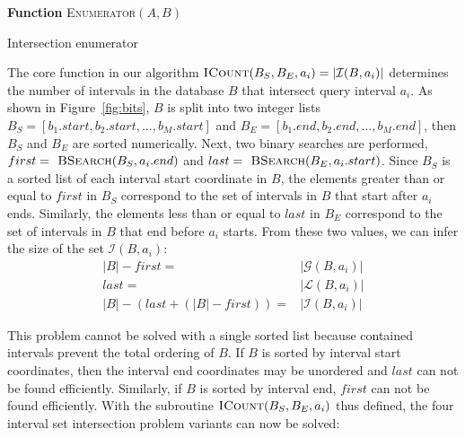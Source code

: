 \documentclass{bioinfo}
\begin{document}
	\begin{algorithm}[h]
		\DontPrintSemicolon
		\footnotesize
		\BlankLine
		\textbf{Function} \textsc{Enumerator}$(A,B)$
		\caption{Intersection enumerator}
	\end{algorithm}


	The core function in our algorithm 
	$\textsc{ICount}(B_S,B_E,a_i) = |\mathcal{I}(B,a_i)|$ determines the number of
	intervals in the database $B$ that intersect query interval $a_i$.  As shown in
	Figure~\ref{fig:bits}, $B$ is split into two integer lists 
	$B_S = [b_1.start, b_2.start, \dots, b_M.start]$ and 
	$B_E = [b_1.end, b_2.end, \dots, b_M.end]$, then $B_S$ and $B_E$ are sorted
	numerically.  Next, two binary searches are performed,
	$first=\textsc{ BSearch}(B_S, a_i.end)$ and 
	$last=\textsc{ BSearch}(B_E,
	a_i.start)$.  Since $B_S$ is a sorted list of each interval start coordinate in
	$B$, the elements greater than or equal to $first$ in $B_S$ correspond to the
	set of intervals in $B$ that start after $a_i$ ends.  Similarly, the elements
	less than or equal to $last$ in $B_E$ correspond to the set of intervals in $B$
	that end before $a_i$ starts.  From these two values, we can infer the size of
	the set $\mathcal{I}(B,a_i)$:
	\begin{equation*}
		\begin{split}
			|B|-first=&|\mathcal{G}(B,a_i)| \\
			last=&|\mathcal{L}(B,a_i)| \\ 
			|B|-(last+(|B|-first))=&|\mathcal{I}(B,a_i)|
		\end{split}
	\end{equation*}

	This problem cannot be solved with a single sorted list because
	contained intervals prevent the total ordering of $B$.  If $B$ is
	sorted by interval start coordinates, then the interval end
	coordinates may be unordered and $last$ can not be found
	efficiently.  Similarly, if $B$ is sorted by interval end,
	$first$ can not be found efficiently.  With the subroutine
	$\textsc{ICount}(B_S,B_E,a_i)$ thus defined, the four interval set intersection
	problem variants can now be solved:
\end{document}
